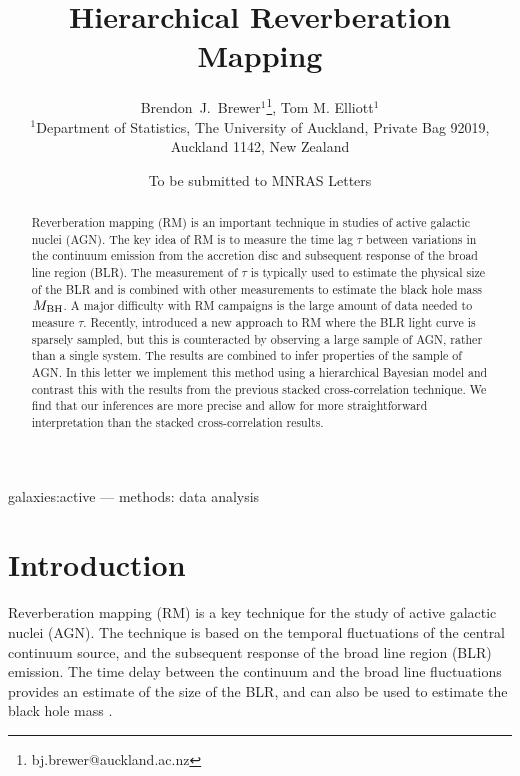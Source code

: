\documentclass[useAMS,usenatbib]{mn2e}
\title[Hierarchical Reverberation Mapping]
{Hierarchical Reverberation Mapping}
\author[Brewer and Elliott]{%
  Brendon~J.~Brewer$^{1}$\thanks{bj.brewer@auckland.ac.nz},
  Tom M. Elliott$^{1}$
  \medskip\\
  $^1$Department of Statistics, The University of Auckland, Private Bag 92019, Auckland 1142, New Zealand}
\begin{document}
             
\date{To be submitted to MNRAS Letters}
             
\maketitle

\label{firstpage}


\begin{abstract}
Reverberation mapping (RM) is an important technique in studies of active
galactic nuclei (AGN). The key idea of RM is to measure the time lag $\tau$
between variations in the continuum emission from the accretion disc
and subsequent response of the broad line region (BLR). The measurement of
$\tau$ is typically used to estimate the physical size of the BLR and is
combined with other measurements to estimate the black hole mass $M_{\rm BH}$.
A major difficulty with RM campaigns is the large amount of data needed to
measure $\tau$. Recently, \citet{2012MNRAS.427.2701F} introduced a new approach
to RM where the BLR light curve is sparsely sampled, but this is counteracted
by observing a large sample of AGN, rather than a single system.
The results are combined to infer properties of the sample of
AGN. In this letter we implement this method using a hierarchical
Bayesian model and contrast this with the results from the previous stacked
cross-correlation technique. We find that our inferences are more precise and
allow for more straightforward interpretation than the stacked cross-correlation
results.
\end{abstract}

\begin{keywords}
galaxies:active --- methods: data analysis
\end{keywords}


\section{Introduction}
Reverberation mapping (RM) is a key technique for the study
of active galactic nuclei (AGN). The technique is based on the temporal
fluctuations of the central continuum source, and the subsequent response
of the broad line region (BLR) emission. The time delay between the continuum
and the broad line fluctuations provides an estimate of the size of the BLR,
and can also be used to estimate the black hole mass \citep{peterson}.
\end{document}
